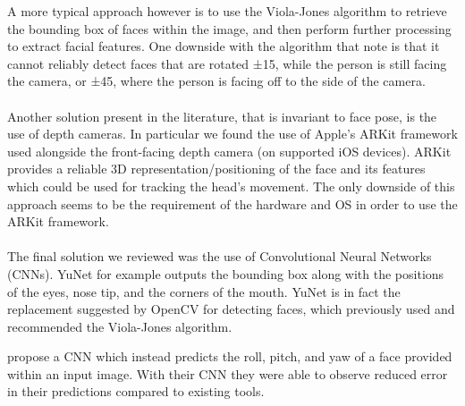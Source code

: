 A more typical approach however is to use the Viola-Jones algorithm to retrieve the bounding box of faces within the image, and then perform further processing to extract facial features\cite{neto2012real, francone2011using, kim2017real}.
One downside with the algorithm that \citeauthor{viola2004robust} note is that it cannot reliably detect faces that are rotated ±15\textdegree, while the person is still facing the camera, or ±45\textdegree, where the person is facing off to the side of the camera.
\\\\
Another solution present in the literature, that is invariant to face pose, is the use of depth cameras. 
In particular we found the use of Apple's ARKit framework used alongside the front-facing depth camera (on supported iOS devices)\cite{voelker2020headreach,hueber2020headbang,deepateep2020facial}.
ARKit provides a reliable 3D representation/positioning of the face and its features  which could be used for tracking the head's movement.
The only downside of this approach seems to be the requirement of the hardware and OS in order to use the ARKit framework.
\\\\
The final solution we reviewed was the use of Convolutional Neural Networks (CNNs).
YuNet\cite{yu2022yunet} for example outputs the bounding box along with the positions of the eyes, nose tip, and the corners of the mouth. YuNet is in fact the replacement suggested by OpenCV for detecting faces, which previously used and recommended the Viola-Jones algorithm.

\citeauthor{yan2021fast} propose a CNN which instead predicts the roll, pitch, and yaw of a face provided within an input image\cite{yan2021fast}. With their CNN they were able to observe reduced error in their predictions compared to existing tools.

